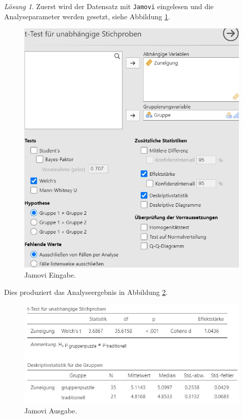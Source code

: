 \documentclass[
]{book}
\theoremstyle{definition}
\theoremstyle{definition}
\theoremstyle{definition}
\theoremstyle{definition}
\theoremstyle{remark}
\newtheorem*{solution}{Lösung}
\begin{document}
\begin{solution}

Zuerst wird der Datensatz mit \texttt{Jamovi} eingelesen und die Analyseparameter werden gesetzt, siehe Abbildung \ref{fig:sol-gruppenpuzzle-input}.

\begin{figure}
\includegraphics[width=1\linewidth]{figures/06-exr-gruppenpuzzle-jmv-input} \caption{Jamovi Eingabe.}\label{fig:sol-gruppenpuzzle-input}
\end{figure}

Dies produziert das Analyseergebnis in Abbildung \ref{fig:sol-gruppenpuzzle-output}.

\begin{figure}
\includegraphics[width=1\linewidth]{figures/06-exr-gruppenpuzzle-jmv-output} \caption{Jamovi Ausgabe.}\label{fig:sol-gruppenpuzzle-output}
\end{figure}


\end{solution}
\end{document}
